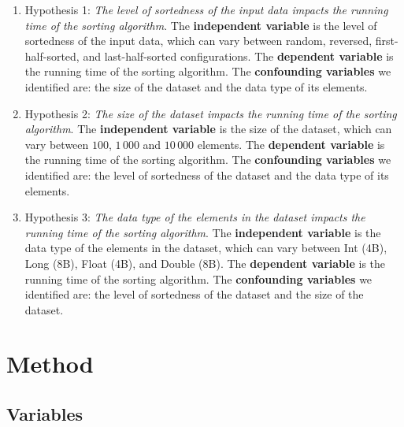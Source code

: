 \documentclass[unicode,11pt,a4paper,oneside,numbers=endperiod,openany]{scrartcl}
\begin{document}
    \begin{enumerate}
        \item Hypothesis 1: \textit{ The level of sortedness of the input data impacts the running time of the sorting algorithm}. The \textbf{independent variable} is the level of sortedness of the input data, which can vary between random, reversed, first-half-sorted, and last-half-sorted configurations. The \textbf{dependent variable} is the running time of the sorting algorithm. The \textbf{confounding variables} we identified are: the size of the dataset and the data type of its elements.

        \item Hypothesis 2: \textit{The size of the dataset impacts the running time of the sorting algorithm}. The \textbf{independent variable} is the size of the dataset, which can vary between $100$, $1\,000$ and $10\,000$ elements. The \textbf{dependent variable} is the running time of the sorting algorithm. The \textbf{confounding variables} we identified are: the level of sortedness of the dataset and the data type of its elements.

        \item Hypothesis 3: \textit{The data type of the elements in the dataset impacts the running time of the sorting algorithm}. The \textbf{independent variable} is the data type of the elements in the dataset, which can vary between Int (4B), Long (8B), Float (4B), and Double (8B). The \textbf{dependent variable} is the running time of the sorting algorithm. The \textbf{confounding variables} we identified are: the level of sortedness of the dataset and the size of the dataset.

    \end{enumerate}

\section{Method}

    \subsection{Variables}
\end{document}
